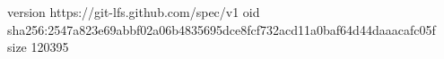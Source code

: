 version https://git-lfs.github.com/spec/v1
oid sha256:2547a823e69abbf02a06b4835695dce8fcf732acd11a0baf64d44daaacafc05f
size 120395
